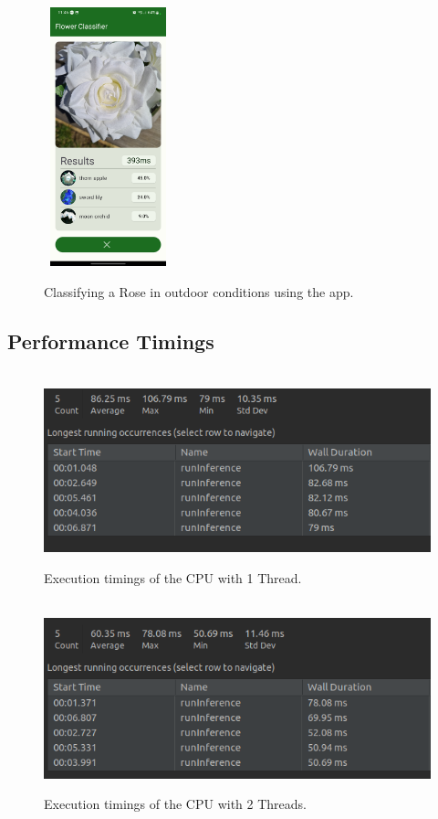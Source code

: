 \documentclass{article}
\begin{document}
\begin{figure}[h]\
    \includegraphics[width=0.3\textwidth]{rose_light_3.jpg}
    \caption{Classifying a Rose in outdoor conditions using the app.}
    \label{fig:rose_light}
\end{figure}

\clearpage

\subsection{Performance Timings}

\label{subsec:perf_timings}

\begin{figure}[h]\
    \includegraphics[width=\textwidth]{CPU1_Time.png}
    \caption{Execution timings of the CPU with 1 Thread.}
    \label{fig:cpu1}
\end{figure}


\begin{figure}[h]\
    \includegraphics[width=\textwidth]{CPU2_Time.png}
    \caption{Execution timings of the CPU with 2 Threads.}
    \label{fig:cpu2}
\end{figure}
\end{document}
